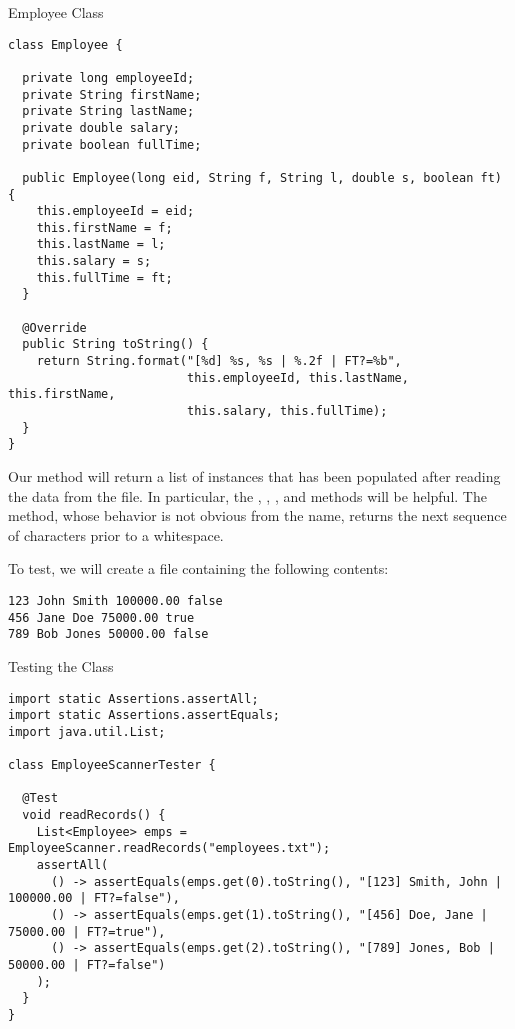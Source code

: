 \begin{cl}{Employee Class}
\begin{lstlisting}[language=MyJava]
class Employee {

  private long employeeId;
  private String firstName;
  private String lastName;
  private double salary;
  private boolean fullTime;
  
  public Employee(long eid, String f, String l, double s, boolean ft) {
    this.employeeId = eid;
    this.firstName = f;
    this.lastName = l;
    this.salary = s;
    this.fullTime = ft;
  }

  @Override
  public String toString() {
    return String.format("[%d] %s, %s | %.2f | FT?=%b", 
                         this.employeeId, this.lastName, this.firstName, 
                         this.salary, this.fullTime);
  }
}
\end{lstlisting}
\end{cl}

Our method will return a list of  instances that has been populated after reading the data from the file. In particular, the , , , and  methods will be helpful. The  method, whose behavior is not obvious from the name, returns the next sequence of characters prior to a whitespace. 

To test, we will create a file containing the following contents:

\begin{verbatim}
123 John Smith 100000.00 false
456 Jane Doe 75000.00 true
789 Bob Jones 50000.00 false
\end{verbatim}

\begin{cl}{Testing the  Class}
\begin{lstlisting}[language=MyJava]
import static Assertions.assertAll;
import static Assertions.assertEquals;
import java.util.List;

class EmployeeScannerTester {

  @Test
  void readRecords() {
    List<Employee> emps = EmployeeScanner.readRecords("employees.txt");
    assertAll(
      () -> assertEquals(emps.get(0).toString(), "[123] Smith, John | 100000.00 | FT?=false"),
      () -> assertEquals(emps.get(1).toString(), "[456] Doe, Jane | 75000.00 | FT?=true"),
      () -> assertEquals(emps.get(2).toString(), "[789] Jones, Bob | 50000.00 | FT?=false")
    );
  }
}
\end{lstlisting}
\end{cl}

